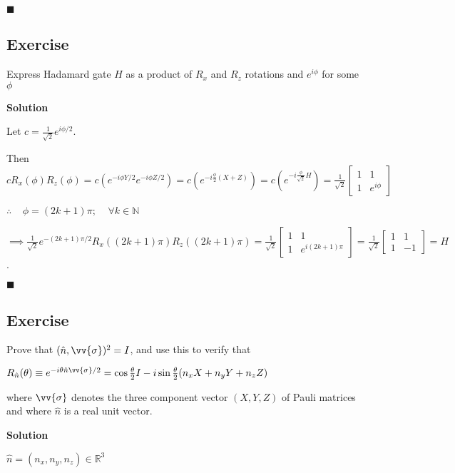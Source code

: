 \documentclass{article}
\begin{document}
$\blacksquare$

\subsection{Exercise}
Express Hadamard gate $H$ as a product of $R_{x}$ and $R_{z}$ rotations and
$e^{i\phi}$ for some $\phi$

\textbf{Solution}

Let $c = \frac{1}{\sqrt{2}}e^{i\phi/2}$.

Then
  $cR_{x}(\phi)R_{z}(\phi) =
  c(e^{-i\phi Y / 2} e^{-i\phi Z / 2}) = 
  c(e^{-i\frac{\phi}{2}(X + Z)}) =
  c(e^{-i\frac{\phi}{\sqrt{2}} H}) =
  \frac{1}{\sqrt{2}}\begin{bmatrix}
    1 & 1 \\
    1 & e^{i\phi}
  \end{bmatrix}$

$\therefore \mspace{20mu} \phi = (2k+1)\pi; \mspace{20mu} \forall k \in{\mathbb{N}}$

$\implies \frac{1}{\sqrt{2}}e^{-(2k+1)\pi/2}R_{x}((2k+1)\pi)R_{z}((2k+1)\pi) =
  \frac{1}{\sqrt{2}}\begin{bmatrix}
    1 & 1 \\
    1 & e^{i(2k+1)\pi}
  \end{bmatrix} = 
  \frac{1}{\sqrt{2}}\begin{bmatrix}
    1 & 1 \\
    1 & -1
  \end{bmatrix} = H$.

$\blacksquare$

\subsection{Exercise}
Prove that $(\hat{n}, \vv{\sigma})^{2} = I$, and use this to verify that
\begin{center}
  $R_{\hat{n}}(\theta) \equiv e^{-i\theta\hat{n}\vv{\sigma}/2} =
  \cos{\frac{\theta}{2}}I - i\sin{\frac{\theta}{2}}(n_{x}X + n_{y}Y + n_{z}Z)$
\end{center}

where $\vv{\sigma}$ denotes the three component vector $(X, Y, Z)$ of Pauli
matrices and where $\hat{n}$ is a real unit vector.

\textbf{Solution}

$\hat{n} = (n_x, n_y, n_z) \in \mathbb{R}^{3}$
\end{document}
